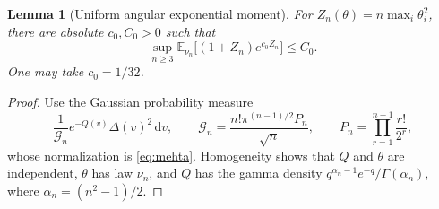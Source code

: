 \documentclass[11pt]{article}
\numberwithin{equation}{section}
\newtheorem{lemma}[theorem]{Lemma}
\theoremstyle{definition}
\newcommand{\dd}{\,\mathrm d}
\begin{document}
\begin{lemma}[Uniform angular exponential moment]\label{lem:rc-angular}
For $Z_n(\theta)=n\max_i\theta_i^2$, there are absolute
$c_0,C_0>0$ such that
\begin{equation}\label{eq:rc-angular-moment}
 \sup_{n\ge3}\mathbb E_{\nu_n}
       \bigl[(1+Z_n)e^{c_0Z_n}\bigr]\le C_0.
\end{equation}
One may take $c_0=1/32$.
\end{lemma}
\begin{proof}
Use the Gaussian probability measure
\[
 \frac1{\mathcal G_n}e^{-Q(v)}\Delta(v)^2\dd v,
 \qquad
 \mathcal G_n=\frac{n!\pi^{(n-1)/2}P_n}{\sqrt n},\qquad
 P_n=\prod_{r=1}^{n-1}\frac{r!}{2^r},
\]
whose normalization is \eqref{eq:mehta}.  Homogeneity shows that
$Q$ and $\theta$ are independent, $\theta$ has law $\nu_n$, and
$Q$ has the gamma density
$q^{\alpha_n-1}e^{-q}/\Gamma(\alpha_n)$, where
$\alpha_n=(n^2-1)/2$.


\end{proof}
\end{document}
